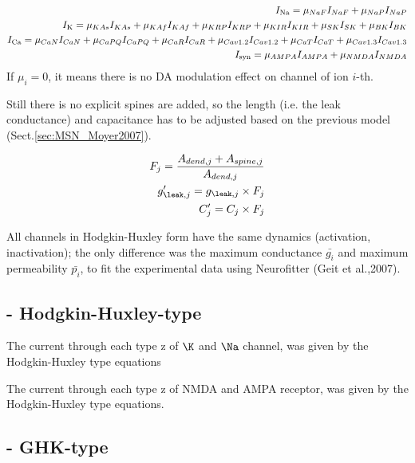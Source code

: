 \begin{equation}
\begin{split}
I_\text{Na} = \mu_{NaF} I_{NaF} + \mu_{NaP} I_{NaP} \\
I_\text{K} = \mu_{KAs} I_{KAs} +
    \mu_{KAf} I_{KAf}  + \mu_{KRP} I_{KRP} + \mu_{KIR} I_{KIR} + \mu_{SK} I_{SK}
    + \mu_{BK} I_{BK} \\
I_\text{Ca} = \mu_{CaN} I_{CaN} + \mu_{CaPQ} I_{CaPQ} +
       \mu_{CaR} I_{CaR} + \mu_{Cav1.2} I_{Cav1.2} +
       \mu_{CaT} I_{CaT} + \mu_{Cav1.3} I_{Cav1.3} \\
I_{\text{syn}} = \mu_{AMPA} I_{AMPA} + \mu_{NMDA} I_{NMDA}
\end{split}
\end{equation}
If $\mu_i = 0$, it means there is no DA modulation effect on channel of
ion $i$-th.


Still there is no explicit spines are added, so the length (i.e. the leak
conductance) and capacitance has to be adjusted based on the previous model
(Sect.\ref{sec:MSN_Moyer2007}).

\begin{equation}
\begin{split}
F_j = \frac{A_{dend,j} + A_{spine,j}}{A_{dend,j}} \\
g'_{\leak,j} = g_{\leak,j} \times F_j \\
C'_j = C_j \times F_j \\
\end{split}
\end{equation}

All channels in Hodgkin-Huxley form have the same dynamics (activation,
inactivation); the only difference was the maximum
conductance $\bar{g_i}$ and maximum permeability $\bar{p_i}$, to
fit the experimental data using Neurofitter (Geit
et al.,2007).

\subsection{- Hodgkin-Huxley-type}

The current through each type z of $\K$ and $\Na$ channel, was given
by the Hodgkin-Huxley type equations

The current through each type z of NMDA and AMPA receptor, was given
by the Hodgkin-Huxley type equations. 



\subsection{- GHK-type}

